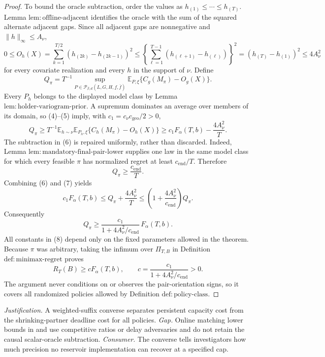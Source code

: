 \documentclass{article}
\begin{document}
\begin{proof}
To bound the oracle subtraction, order the values as \(h_{(1)}\le\cdots\le h_{(T)}\).  Lemma \(\mathrm{lem:offline\text{-}adjacent}\) identifies the oracle with the sum of the squared alternate adjacent gaps.  Since all adjacent gaps are nonnegative and \(\|h\|_\infty\le A_\nu\),
\[
0\le O_h(X)
=\sum_{k=1}^{T/2}(h_{(2k)}-h_{(2k-1)})^2
\le\left\{\sum_{\ell=1}^{T-1}(h_{(\ell+1)}-h_{(\ell)})\right\}^2
=(h_{(T)}-h_{(1)})^2
\le 4A_\nu^2
\tag{5}
\]
for every covariate realization and every \(h\) in the support of \(\nu\).  Define
\[
Q_\pi
=T^{-1}\sup_{P\in\mathcal P_{\beta,d}(L,G,H,\underline f,\overline f)}
 \mathbb E_{P,\xi}\{C_g(M_\pi)-O_g(X)\}.
\]
Every \(P_h\) belongs to the displayed model class by Lemma \(\mathrm{lem:holder\text{-}variogram\text{-}prior}\).  A supremum dominates an average over members of its domain, so (4)--(5) imply, with \(c_1=c_\nu c_{\mathrm{geo}}/2>0\),
\[
Q_\pi
\ge T^{-1}\mathbb E_{h\sim\nu}
 \mathbb E_{P_h,\xi}\{C_h(M_\pi)-O_h(X)\}
\ge c_1F_\alpha(T,b)-\frac{4A_\nu^2}{T}.
\tag{6}
\]
The subtraction in (6) is repaired uniformly, rather than discarded.  Indeed, Lemma \(\mathrm{lem:mandatory\text{-}final\text{-}pair\text{-}lower}\) supplies one law in the same model class for which every feasible \(\pi\) has normalized regret at least \(c_{\mathrm{end}}/T\).  Therefore
\[
Q_\pi\ge \frac{c_{\mathrm{end}}}{T}.
\tag{7}
\]
Combining (6) and (7) yields
\[
c_1F_\alpha(T,b)
\le Q_\pi+\frac{4A_\nu^2}{T}
\le \left(1+\frac{4A_\nu^2}{c_{\mathrm{end}}}\right)Q_\pi.
\]
Consequently
\[
Q_\pi\ge
\frac{c_1}{1+4A_\nu^2/c_{\mathrm{end}}}\,F_\alpha(T,b).
\tag{8}
\]
All constants in (8) depend only on the fixed parameters allowed in the theorem.  Because \(\pi\) was arbitrary, taking the infimum over \(\Pi_{T,B}\) in Definition \(\mathrm{def:minimax\text{-}regret}\) proves
\[
R_T(B)\ge cF_\alpha(T,b),
\qquad
c=\frac{c_1}{1+4A_\nu^2/c_{\mathrm{end}}}>0.
\]
The argument never conditions on or observes the pair-orientation signs, so it covers all randomized policies allowed by Definition \(\mathrm{def:policy\text{-}class}\).
\end{proof}
\par\smallskip\noindent \textit{Justification.} A weighted-suffix converse separates persistent capacity cost from the shrinking-partner deadline cost for all policies. \textit{Gap.} Online matching lower bounds in \cite{ascheretal2026generalarrivals} and \cite{azarchiplunkarkaplan2017delays} use competitive ratios or delay adversaries and do not retain the causal scalar-oracle subtraction. \textit{Consumer.} The converse tells investigators how much precision no reservoir implementation can recover at a specified cap.
\end{document}
